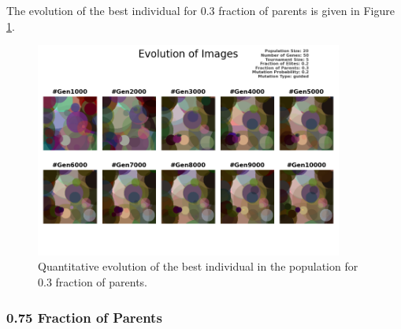 \documentclass{assignment}
\begin{document}
The evolution of the best individual for 0.3 fraction of parents is given in Figure \ref{fig:0.3parents_image}.
\begin{figure}[!htb]
    \centering
    \includegraphics[width=0.9\textwidth]{figures/images_output_20_50_5_0.2_0.3_0.2_guided.png}
    \caption{Quantitative evolution of the best individual in the population for 0.3 fraction of parents.}
    \label{fig:0.3parents_image}
\end{figure}

\subsubsection{0.75 Fraction of Parents}
\end{document}
